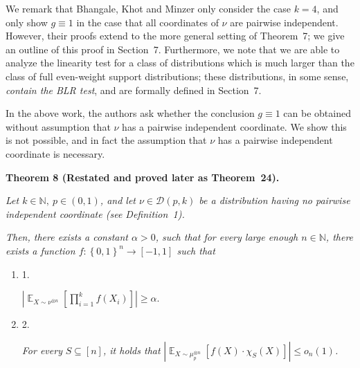 \documentclass[10pt,a4paper]{article}
\begin{document}
We remark that Bhangale, Khot and Minzer only consider the case $k=4$, and only show $g\equiv 1$ in the case that all coordinates of $\nu$ are pairwise independent.
However, their proofs extend to the more general setting of Theorem 7; we give an outline of this proof in Section 7.
Furthermore, we note that we are able to analyze the linearity test for a class of distributions which is much larger than the class of full even-weight support distributions; these distributions, in some sense, \emph{contain the BLR test}, and are formally defined in Section 7.\par




In the above work, the authors ask whether the conclusion $g\equiv 1$ can be obtained without assumption that $\nu$ has a pairwise independent coordinate.
We show this is not possible, and in fact the assumption that $\nu$ has a pairwise independent coordinate is necessary.\par





\par\medskip\noindent\textbf{
\textbf{Theorem 8}\textbf{ }(Restated and proved later as Theorem 24)\textbf{.}
}\par



\emph{Let $k\in\mathbb{N},\ p\in(0,1)$, and let $\nu\in\mathcal{D}(p,k)$ be a distribution having no pairwise independent coordinate (see Definition 1).}\par




\emph{Then, there exists a constant $\alpha>0$, such that for every large enough $n\in\mathbb{N}$, there exists a function $f:\left\{0,1\right\}^{n}\to[-1,1]$ such that}\par


\begin{enumerate}


\item[] 
1. 


$\left|\mathop{\mathbb{E}}_{X\sim\nu^{\otimes n}}\left[\prod_{i=1}^{k}f(X_{i})\right]\right|\geqslant\alpha.$\emph{}\par





\item[] 
2. 


\emph{For every }$S\subseteq[n]$\emph{, it holds that }$\left|\mathop{\mathbb{E}}_{X\sim\mu_{p}^{\otimes n}}\left[f(X)\cdot\chi_{S}(X)\right]\right|\leqslant o_{n}(1)$\emph{.}\par





\end{enumerate}
\end{document}

